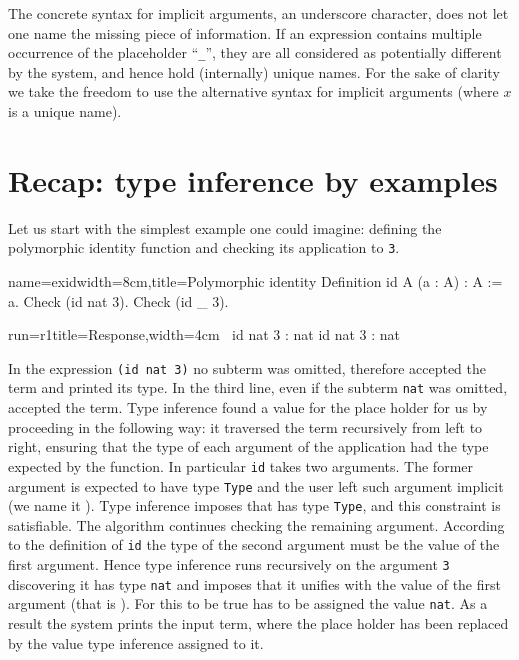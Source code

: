 The concrete syntax for implicit arguments, an underscore character,
does not let one name the missing piece of information.
If an expression contains multiple occurrence
of the placeholder ``\lstinline/_/'', they are all considered as
potentially different by the system, and hence hold (internally)
unique names.  For the sake of clarity we take the freedom to
use the alternative syntax  for implicit arguments (where
$x$ is a unique name).

\section{Recap: type inference by examples}

Let us start with the simplest example one could imagine: defining the
polymorphic identity function and checking its application to
\lstinline/3/.

\begin{coq-left}{name=exid}{width=8cm,title=Polymorphic identity}
Definition id A (a : A) : A := a.
Check (id nat 3).
Check (id _ 3).
\end{coq-left}
\begin{coqout-right}{run=r1}{title=Response,width=4cm}
$~$
id nat 3 : nat
id nat 3 : nat
\end{coqout-right}

In the expression \lstinline/(id nat 3)/ no subterm was omitted,
therefore \Coq{} accepted the term and printed its type.  In the third
line, even if the subterm \lstinline/nat/ was omitted, \Coq{} accepted
the term.  Type inference found a value for the place holder
for us by proceeding in the following way:  it traversed the term
recursively from left to right, ensuring that the type of each
argument of the application had the type expected by the function.  In
particular \lstinline/id/ takes two arguments.
The former argument is expected to have type \lstinline/Type/ and the
user left such argument implicit (we name it ).   Type
inference imposes that  has type \lstinline/Type/, and this
constraint is satisfiable.  The algorithm continues checking the
remaining argument.  According to the definition of \lstinline/id/ the type of
the second argument must be the value of the first argument.  Hence
type inference runs recursively on the argument \lstinline/3/
discovering it has type \lstinline/nat/ and imposes that it unifies
with the value of the first argument (that is ).  For this
to be true  has to be assigned the value \lstinline/nat/.
As a result the system prints the input term, where the place holder
has been replaced by the value type inference assigned to it.

